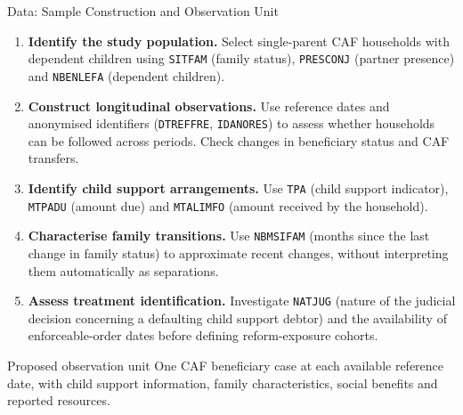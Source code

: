 \documentclass[aspectratio=169,10pt]{beamer}
\begin{document}
\begin{frame}{Data: Sample Construction and Observation Unit}

\small
\begin{enumerate}
\setlength{\itemsep}{0.20cm}

\item \textbf{Identify the study population.}
Select single-parent CAF households with dependent children
using \texttt{SITFAM} (family status),
\texttt{PRESCONJ} (partner presence) and
\texttt{NBENLEFA} (dependent children).

\item \textbf{Construct longitudinal observations.}
Use reference dates and anonymised identifiers
(\texttt{DTREFFRE}, \texttt{IDANORES}) to assess
whether households can be followed across periods.
Check changes in beneficiary status and CAF transfers.

\item \textbf{Identify child support arrangements.}
Use \texttt{TPA} (child support indicator),
\texttt{MTPADU} (amount due) and
\texttt{MTALIMFO} (amount received by the household).

\item \textbf{Characterise family transitions.}
Use \texttt{NBMSIFAM} (months since the last change
in family status) to approximate recent changes,
without interpreting them automatically as separations.


\item \textbf{Assess treatment identification.}
Investigate \texttt{NATJUG} (nature of the judicial decision
concerning a defaulting child support debtor) and the
availability of enforceable-order dates before defining
reform-exposure cohorts.


\end{enumerate}


\begin{block}{Proposed observation unit}
One CAF beneficiary case at each available reference date,
with child support information, family characteristics,
social benefits and reported resources.
\end{block}

\end{frame}
\end{document}
